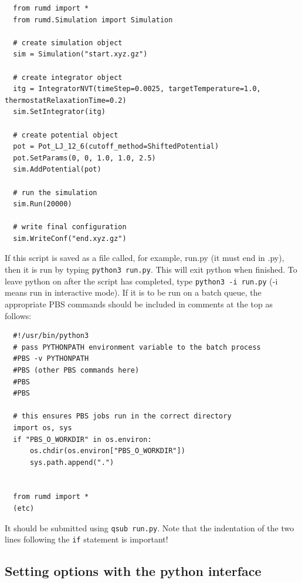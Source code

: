 \begin{verbatim}
  from rumd import *
  from rumd.Simulation import Simulation

  # create simulation object
  sim = Simulation("start.xyz.gz")

  # create integrator object
  itg = IntegratorNVT(timeStep=0.0025, targetTemperature=1.0, thermostatRelaxationTime=0.2)
  sim.SetIntegrator(itg)

  # create potential object
  pot = Pot_LJ_12_6(cutoff_method=ShiftedPotential)
  pot.SetParams(0, 0, 1.0, 1.0, 2.5)
  sim.AddPotential(pot)

  # run the simulation
  sim.Run(20000)

  # write final configuration
  sim.WriteConf("end.xyz.gz")
\end{verbatim}


If this script is saved as a file called, for example, run.py (it must end in
.py), then it is run by typing
\verb|python3 run.py|. This will exit python when finished. To leave python on
after the script has completed, type \verb|python3 -i run.py| (-i means run in
interactive mode). If it is to be run on a batch queue, the appropriate PBS
commands should be included in comments at the top as follows:

\begin{verbatim}
  #!/usr/bin/python3
  # pass PYTHONPATH environment variable to the batch process
  #PBS -v PYTHONPATH
  #PBS (other PBS commands here)
  #PBS 
  #PBS 

  # this ensures PBS jobs run in the correct directory
  import os, sys
  if "PBS_O_WORKDIR" in os.environ:
      os.chdir(os.environ["PBS_O_WORKDIR"])
      sys.path.append(".")


  from rumd import *
  (etc)
\end{verbatim}

It should be submitted using \verb|qsub run.py|. Note that the 
indentation of the two lines following the \verb|if| statement is important!

\subsection{Setting options with the python interface}

